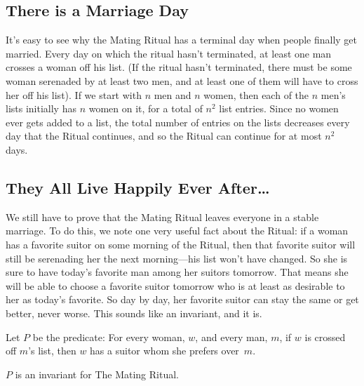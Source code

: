 \subsection{There is a Marriage Day}

It's easy to see why the Mating Ritual has a terminal day when people
finally get married.  Every day on which the ritual hasn't terminated, at
least one man crosses a woman off his list.  (If the ritual hasn't
terminated, there must be some woman serenaded by at least two men, and at
least one of them will have to cross her off his list).  If we start with
$n$ men and $n$ women, then each of the $n$ men's lists initially has $n$
women on it, for a total of $n^2$ list entries.  Since no women ever gets
added to a list, the total number of entries on the lists decreases every
day that the Ritual continues, and so the Ritual can continue for at most
$n^2$ days.

\subsection{They All Live Happily Ever After\dots}

We still have to prove that the Mating Ritual leaves everyone in a
stable marriage.  To do this, we note one very useful fact about the
Ritual: if a woman has a favorite suitor on some morning of the
Ritual, then that favorite suitor will still be serenading her the
next morning---his list won't have changed.  So she is sure to
have today's favorite man among her suitors tomorrow.  That means she
will be able to choose a favorite suitor tomorrow who is at least as
desirable to her as today's favorite.  So day by day, her favorite
suitor can stay the same or get better, never worse.  This sounds like
an invariant, and it is.

\begin{definition}\label{def:P8}
Let $P$ be the predicate: For every woman, $w$, and every man, $m$, if
$w$ is crossed off $m$'s list, then $w$ has a suitor whom she prefers
over~$m$.
\end{definition}

\begin{lemma}\label{lem:5P}
$P$ is an invariant for The Mating Ritual.
\end{lemma}

